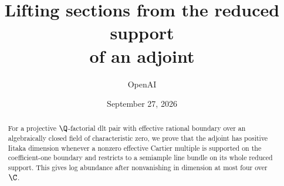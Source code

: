 \documentclass[11pt]{article}
\title{Lifting sections from the reduced support\\of an adjoint}
\author{OpenAI}
\date{September 27, 2026}
\begin{document}
\maketitle
\begin{abstract}
For a projective \(\Q\)-factorial dlt pair with effective rational boundary
over an algebraically closed field of characteristic zero, we prove that the
adjoint has positive Iitaka dimension whenever a nonzero effective Cartier
multiple is supported on the coefficient-one boundary and restricts to a
semiample line bundle on its whole reduced support. This gives log abundance
after nonvanishing in dimension at most four over \(\C\).
\end{abstract}
\setcounter{tocdepth}{1}
\begingroup\small\tableofcontents\endgroup
\clearpage







\appendix


\end{document}
